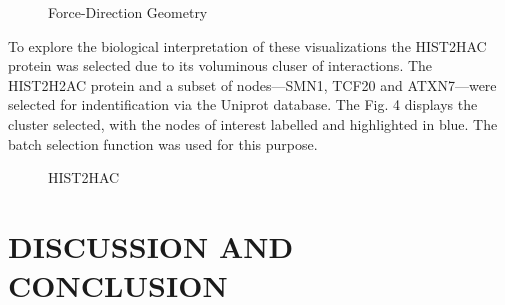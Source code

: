 \documentclass[letterpaper, 10 pt, conference]{ieeeconf}  %
\begin{document}
\begin{figure}[h!]
    \centering

    \caption{Force-Direction Geometry}
\end{figure}


To explore the biological interpretation of these visualizations the HIST2HAC protein was selected due to its voluminous cluser of interactions. The HIST2H2AC protein and a subset of nodes---SMN1, TCF20 and ATXN7---were selected for indentification via the Uniprot database. The Fig. 4 displays the cluster selected, with the nodes of interest labelled and highlighted in blue. The batch selection function was used for this purpose.

\begin{figure}[h!]
    \centering

    \caption{HIST2HAC}
\end{figure}

\section{DISCUSSION AND CONCLUSION}
\end{document}
